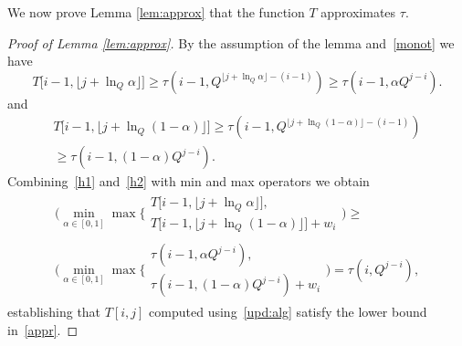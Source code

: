 \documentclass[11pt]{article}
\begin{document}
We now prove Lemma \ref{lem:approx} that the function $T$ approximates $\tau$.
\begin{proof}[Proof of Lemma \ref{lem:approx}]
By the assumption of the lemma and~\eqref{monot} we have
\begin{equation}\label{h1}
T\big[i-1,\lfloor j + \ln_{Q}\alpha\rfloor\big]\geq\tau(i-1,Q^{\lfloor j + \ln_{Q}\alpha\rfloor-(i-1)})
\geq\tau(i-1,\alpha Q^{j-i}).
\end{equation}
and
\begin{multline}\label{h2}
T\big[i-1,\lfloor j + \ln_{Q} (1-\alpha)\rfloor\big]\geq\tau\left(i-1,Q^{\lfloor j + \ln_{Q}(1-\alpha)\rfloor-(i-1)}\right)
\\
\geq\tau(i-1,(1-\alpha) Q^{j-i}).
\end{multline}
Combining~\eqref{h1} and~\eqref{h2} with min and max operators we obtain
\begin{equation*}
\begin{split}
\Bigg(\min_{\alpha\in [0,1]} \max\Bigg\{\begin{array}{l}
  T\big[i-1,\lfloor j + \ln_{Q}\alpha\rfloor\big],\\
  T\big[i-1,\lfloor j + \ln_{Q}(1-\alpha)\rfloor\big] + w_i
\end{array}\Bigg) \geq \\
\Bigg(\min_{\alpha\in [0,1]} \max\Bigg\{\begin{array}{l}
  \tau(i-1,\alpha Q^{j-i}),\\
  \tau(i-1,(1-\alpha) Q^{j-i}) + w_i
\end{array}\Bigg) = \tau(i,Q^{j-i}),
\end{split}
\end{equation*}
establishing that $T[i,j]$ computed using~\eqref{upd:alg} satisfy the lower bound in~\eqref{appr}.


\end{proof}
\end{document}
